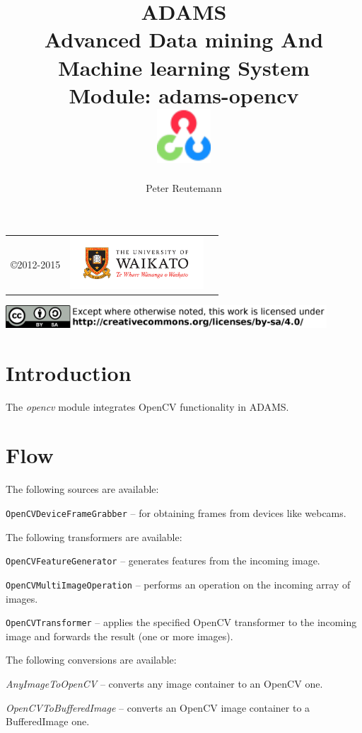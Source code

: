 \documentclass[a4paper]{book}
\title{
  \textbf{ADAMS} \\
  {\Large \textbf{A}dvanced \textbf{D}ata mining \textbf{A}nd \textbf{M}achine
  learning \textbf{S}ystem} \\
  {\Large Module: adams-opencv} \\
  \vspace{1cm}
  \includegraphics[width=2cm]{images/opencv-module.png} \\
}
\author{
  Peter Reutemann
}
\begin{document}
\begin{titlepage}
\maketitle

\thispagestyle{empty}
\center
\begin{table}[b]
	\begin{tabular}{c l l}
		\parbox[c][2cm]{2cm}{\copyright 2012-2015} &
		\parbox[c][2cm]{5cm}{\includegraphics[width=5cm]{images/coat_of_arms.pdf}} \\
	\end{tabular}
	\includegraphics[width=12cm]{images/cc.png} \\
\end{table}

\end{titlepage}

\tableofcontents
\listoffigures

\chapter{Introduction}
The \textit{opencv} module integrates OpenCV functionality \cite{opencv} in ADAMS.

\chapter{Flow}
The following sources are available:
\begin{tight_itemize}
  \item \texttt{OpenCVDeviceFrameGrabber} -- for obtaining frames from devices like webcams.
\end{tight_itemize}
The following transformers are available:
\begin{tight_itemize}
  \item \texttt{OpenCVFeatureGenerator} -- generates features from the incoming image.
  \item \texttt{OpenCVMultiImageOperation} -- performs an operation on the incoming array of images.
  \item \texttt{OpenCVTransformer} -- applies the specified OpenCV transformer to the incoming image and
  forwards the result (one or more images).
\end{tight_itemize}
The following conversions are available:
\begin{tight_itemize}
  \item \textit{AnyImageToOpenCV} -- converts any image container to an OpenCV one.
  \item \textit{OpenCVToBufferedImage} -- converts an OpenCV image container to a BufferedImage one.
\end{tight_itemize}


\end{document}
